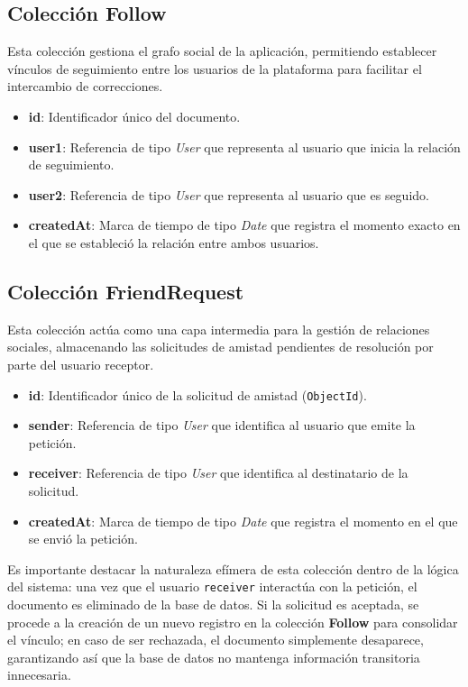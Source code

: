\subsection{Colección Follow}
Esta colección gestiona el grafo social de la aplicación, permitiendo establecer vínculos de seguimiento entre los usuarios de la plataforma para facilitar el intercambio de correcciones.

\begin{itemize}
    \item \textbf{id}: Identificador único del documento.
    \item \textbf{user1}: Referencia de tipo \textit{User} que representa al usuario que inicia la relación de seguimiento.
    \item \textbf{user2}: Referencia de tipo \textit{User} que representa al usuario que es seguido.
    \item \textbf{createdAt}: Marca de tiempo de tipo \textit{Date} que registra el momento exacto en el que se estableció la relación entre ambos usuarios.
\end{itemize}

\subsection{Colección FriendRequest}
Esta colección actúa como una capa intermedia para la gestión de relaciones sociales, almacenando las solicitudes de amistad pendientes de resolución por parte del usuario receptor.

\begin{itemize}
    \item \textbf{id}: Identificador único de la solicitud de amistad (\texttt{ObjectId}).
    \item \textbf{sender}: Referencia de tipo \textit{User} que identifica al usuario que emite la petición.
    \item \textbf{receiver}: Referencia de tipo \textit{User} que identifica al destinatario de la solicitud.
    \item \textbf{createdAt}: Marca de tiempo de tipo \textit{Date} que registra el momento en el que se envió la petición.
\end{itemize}

Es importante destacar la naturaleza efímera de esta colección dentro de la lógica del sistema: una vez que el usuario \texttt{receiver} interactúa con la petición, el documento es eliminado de la base de datos. Si la solicitud es aceptada, se procede a la creación de un nuevo registro en la colección \textbf{Follow} para consolidar el vínculo; en caso de ser rechazada, el documento simplemente desaparece, garantizando así que la base de datos no mantenga información transitoria innecesaria.


